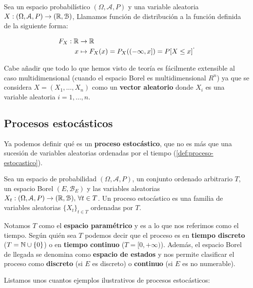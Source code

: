 \begin{definicion}
  Sea un espacio probabilístico $(\Omega, \mathcal{A}, P)$ y una variable aleatoria $X: (\Omega, \mathcal{A}, P) \to (\mathbb{R}, \mathcal{B})$, Llamamos función de distribución a la función definida de la siguiente forma:

  $$\begin{aligned} F_X : \mathbb{R} & \to \mathbb{R} \\
      x & \mapsto F_X(x) = P_X((-\infty, x]) = P[X \leq x]
    \end{aligned}.$$
\label{def:funcion-distribucion}
\end{definicion}

Cabe añadir que todo lo que hemos visto de teoría es fácilmente extensible al caso multidimensional (cuando el espacio Borel es multidimensional $R^n$) ya que se considera $X = (X_1, \ldots, X_n)$ como un \textbf{vector aleatorio} donde $X_i$ es una variable aleatoria $i = 1, \ldots, n$.

\subsection{Procesos estocásticos}

Ya podemos definir qué es un \textbf{proceso estocástico}, que no es más que una sucesión de variables aleatorias ordenadas por el tiempo (\autoref{def:proceso-estocastico}).

\begin{definicion}
  Sea un espacio de probabilidad $(\Omega, \mathcal{A}, P)$, un conjunto ordenado arbitrario $T$, un espacio Borel $(E, \mathcal{B}_E)$ y las variables aleatorias $X_t : (\Omega, \mathcal{A}, P) \to (\mathbb{R}, \mathcal{B}), \, \forall t \in T$. Un proceso estocástico es una familia de variables aleatorias $\{X_t\}_{t \in T}$ ordenadas por $T$.
  \label{def:proceso-estocastico}
\end{definicion}

Notamos $T$ como el \textbf{espacio paramétrico} y es a lo que nos referimos como el tiempo. Según quién sea $T$ podemos decir que el proceso es en \textbf{tiempo discreto} ($T = \mathbb{N} \cup \{0\}$) o en \textbf{tiempo continuo} ($T = [0, + \infty)$). Además, el espacio Borel de llegada se denomina como \textbf{espacio de estados} y nos permite clasificar el proceso como \textbf{discreto} (si $E$ es discreto) o \textbf{continuo} (si $E$ es no numerable).

Listamos unos cuantos ejemplos ilustrativos de procesos estocásticos:

